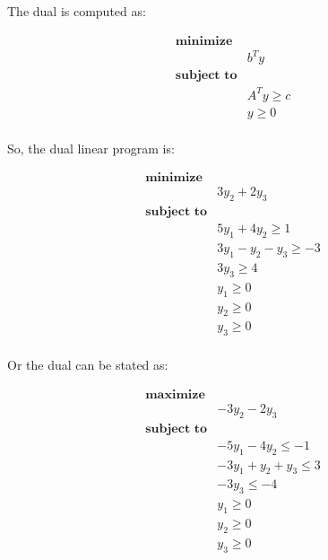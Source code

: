 \documentclass{article}
\begin{document}
    The dual is computed as:

    \begin{equation*}
        \begin{aligned}
            \textbf{minimize} \\
            & b^T y \\
            \textbf{subject to} \\
            & A^Ty \ge c \\
            & y \ge 0 \\
        \end{aligned}
    \end{equation*}

    So, the dual linear program is:

    \begin{equation*}
        \begin{aligned}
            \textbf{minimize} \\
            & 3y_2 + 2y_3 \\
            \textbf{subject to} \\
            & 5y_1 + 4y_2 \ge 1 \\
            & 3y_1 - y_2 - y_3 \ge -3 \\
            & 3y_3 \ge 4 \\
            & y_1 \ge 0 \\
            & y_2 \ge 0 \\
            & y_3 \ge 0 \\
        \end{aligned}
    \end{equation*}

    Or the dual can be stated as:

    \begin{equation*}
        \begin{aligned}
            \textbf{maximize} \\
            & -3y_2 - 2y_3 \\
            \textbf{subject to} \\
            & -5y_1 - 4y_2 \le -1 \\
            & -3y_1 + y_2 + y_3 \le 3 \\
            & -3y_3 \le -4 \\
            & y_1 \ge 0 \\
            & y_2 \ge 0 \\
            & y_3 \ge 0 \\
        \end{aligned}
    \end{equation*}
\end{document}
